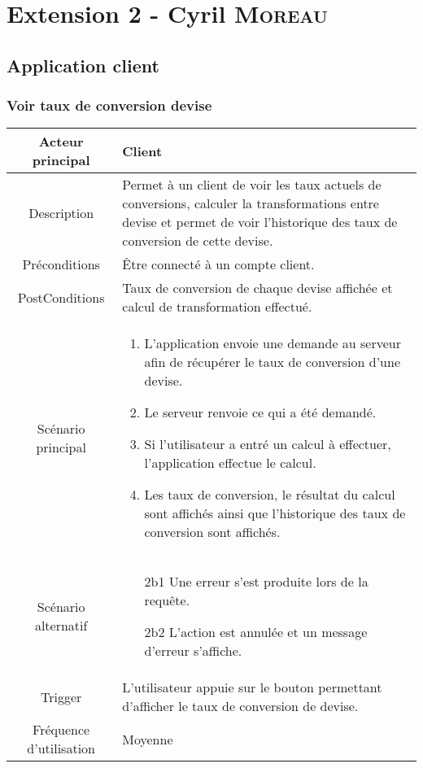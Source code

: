 \documentclass{article}
\begin{document}
\newpage

\section{Extension 2 - Cyril \textsc{Moreau}}
\subsection{Application client}
\subsubsection{Voir taux de conversion devise}
\begin{table}[h]
   \begin{tabular}{|c|p{10cm}|}
      \hline
      Acteur principal&Client\\
      \hline
      Description&Permet à un client de voir les taux actuels de conversions, calculer la transformations entre devise et permet de voir l'historique des taux de conversion de cette devise.\\
      \hline
      Préconditions&Être connecté à un compte client.\\
      \hline
      PostConditions&Taux de conversion de chaque devise affichée et calcul de transformation effectué.\\
      \hline
      Scénario principal& 
            \begin{enumerate}
               \item L'application envoie une demande au serveur afin de récupérer le taux de conversion d'une devise.
               \item Le serveur renvoie ce qui a été demandé.
               \item Si l'utilisateur a entré un calcul à effectuer, l'application effectue le calcul.
               \item Les taux de conversion, le résultat du calcul sont affichés ainsi que l'historique des taux de conversion sont affichés.
            \end{enumerate}     \\
      \hline
      Scénario alternatif&
            \begin{itemize}
               \item[2b1] Une erreur s'est produite lors de la requête.
               \item[2b2] L'action est annulée et un message d'erreur s'affiche.  
            \end{itemize}\\
      \hline
      Trigger&L'utilisateur appuie sur le bouton permettant d'afficher le taux de conversion de devise.\\
      \hline
      Fréquence d'utilisation&Moyenne\\
      \hline
   \end{tabular}
\end{table}
\end{document}
